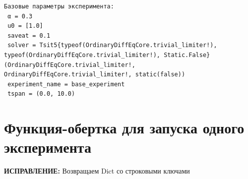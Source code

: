 \documentclass[
  12pt,
  a4paper,
  DIV=11,
  numbers=noendperiod]{scrreprt}
\newenvironment{Shaded}{\begin{snugshade}}{\end{snugshade}}
\newcommand{\ControlFlowTok}[1]{\textcolor[rgb]{0.00,0.23,0.31}{#1}}
\newcommand{\FloatTok}[1]{\textcolor[rgb]{0.68,0.00,0.00}{#1}}
\newcommand{\FunctionTok}[1]{\textcolor[rgb]{0.28,0.35,0.67}{#1}}
\newcommand{\KeywordTok}[1]{\textcolor[rgb]{0.00,0.23,0.31}{#1}}
\newcommand{\NormalTok}[1]{\textcolor[rgb]{0.00,0.23,0.31}{#1}}
\newcommand{\OperatorTok}[1]{\textcolor[rgb]{0.37,0.37,0.37}{#1}}
\newcommand{\SpecialCharTok}[1]{\textcolor[rgb]{0.37,0.37,0.37}{#1}}
\newcommand{\StringTok}[1]{\textcolor[rgb]{0.13,0.47,0.30}{#1}}
\begin{document}
\begin{Shaded}
\end{Shaded}

\begin{verbatim}
Базовые параметры эксперимента:
 α = 0.3
 u0 = [1.0]
 saveat = 0.1
 solver = Tsit5{typeof(OrdinaryDiffEqCore.trivial_limiter!), typeof(OrdinaryDiffEqCore.trivial_limiter!), Static.False}(OrdinaryDiffEqCore.trivial_limiter!, OrdinaryDiffEqCore.trivial_limiter!, static(false))
 experiment_name = base_experiment
 tspan = (0.0, 10.0)
\end{verbatim}

\section{Функция-обертка для запуска одного
эксперимента}\label{ux444ux443ux43dux43aux446ux438ux44f-ux43eux431ux435ux440ux442ux43aux430-ux434ux43bux44f-ux437ux430ux43fux443ux441ux43aux430-ux43eux434ux43dux43eux433ux43e-ux44dux43aux441ux43fux435ux440ux438ux43cux435ux43dux442ux430}

\textbf{ИСПРАВЛЕНИЕ:} Возвращаем Dict со строковыми ключами
\end{document}
